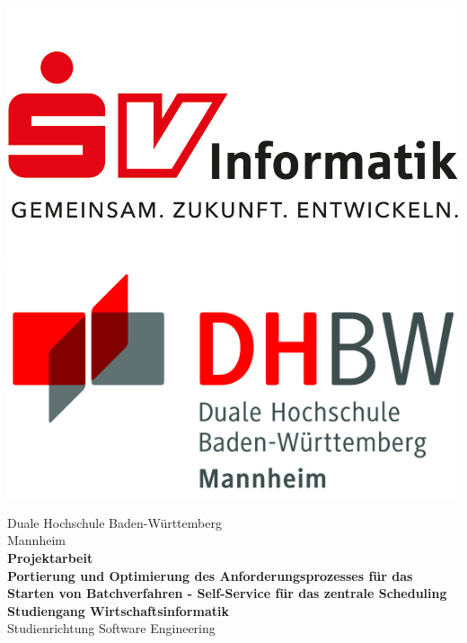 \begin{titlepage}
	\begin{minipage}{\textwidth}
		\vspace{-2cm}
		\noindent \includegraphics[scale=0.71]{resource/SV-Inforamtik-Logo.jpg} \hfill   \includegraphics{resource/DHBW-Logo.jpg}
	\end{minipage}
	\vspace{1em}
	\sffamily
	\begin{center}
		\textsf{\large{}Duale Hochschule Baden-W\"urttemberg\\[1.5mm] Mannheim}\\[2em]
		\textsf{\textbf{\Large{}Projektarbeit}}\\[3mm]
		\textsf{\textbf{Portierung und Optimierung des Anforderungsprozesses für das Starten von Batchverfahren - Self-Service für das zentrale Scheduling}} \\[1.5cm]
		\textsf{\textbf{\Large{}Studiengang Wirtschaftsinformatik}\\[3mm] \textsf{Studienrichtung Software Engineering}}
		
		\vspace{3em}
		\vfill
		

\end{center}
\end{titlepage}
